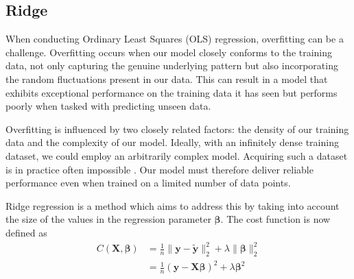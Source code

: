 \documentclass{article}
\begin{document}
\subsection{Ridge}
When conducting Ordinary Least Squares (OLS) regression, overfitting can be a challenge. Overfitting occurs when our model closely conforms to the training data, not only capturing the genuine underlying pattern but also incorporating the random fluctuations present in our data. This can result in a model that exhibits exceptional performance on the training data it has seen but performs poorly when tasked with predicting unseen data.

Overfitting is influenced by two closely related factors: the density of our training data and the complexity of our model. Ideally, with an infinitely dense training dataset, we could employ an arbitrarily complex model. Acquiring such a dataset is in practice often impossible%
. Our model must therefore deliver reliable performance even when trained on a limited number of data points.


Ridge regression is a method which aims to address this by taking into account the size of the values in the regression parameter $\boldsymbol{\beta}$. The cost function is now defined as
\begin{align*}
    C \left( \boldsymbol{X}, \boldsymbol{\beta} \right) &= \frac{1}{n} \lVert\boldsymbol{y} - \boldsymbol{\tilde{y}} \rVert_2^2 + \lambda \lVert \boldsymbol{\beta} \rVert_2^2 \\
    &= \frac{1}{n} \left( \boldsymbol{y} - \boldsymbol{X\beta} \right)^2 + \lambda \boldsymbol{\beta}^2
\end{align*}

\end{document}
